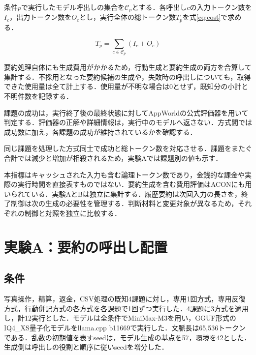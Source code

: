 \documentclass[letter]{ieicej}
\begin{document}
\par\noindent\begin{minipage}{\columnwidth}
\setlength{\abovedisplayskip}{4pt}\setlength{\belowdisplayskip}{4pt}
条件$p$で実行したモデル呼出しの集合を$\mathcal C_p$とする．各呼出し$c$の入力トークン数を$I_c$，出力トークン数を$O_c$とし，実行全体の総トークン数$T_p$を\mbox{式\eqref{eq:cost}で求める．}

\begin{equation}
 T_p=\sum_{c\in\mathcal C_p}(I_c+O_c)
 \label{eq:cost}
\end{equation}

要約処理自体にも生成費用がかかるため，行動生成と要約生成の両方を合算して集計する．不採用となった要約候補の生成や，失敗時の呼出しについても，取得できた使用量は全て計上する．使用量が不明な場合は0とせず，既知分の小計と不明件数を記録する．

\end{minipage}\par{}

課題の成功は，実行終了後の最終状態に対してAppWorld\cite{trivedi2024appworld}の公式評価器を用いて判定する．評価器の正解や詳細情報は，実行中のモデルへ返さない．方式間では成功数に加え，各課題の成功が維持されているかを確認する．

同じ課題を処理した方式同士で成功と総トークン数を対応させる．課題をまたぐ合計では減少と増加が相殺されるため，実験Aでは課題別の値も示す．

本指標はキャッシュされた入力も含む論理トークン数であり，金銭的な課金や実際の実行時間を直接表すものではない\cite{xu2026tokenpilot}．要約生成を含む費用評価はACON\cite{kang2026acon}にも用いられている．実験AとBは独立に集計する．履歴要約は次回入力の長さを，終了制御は次の生成の必要性を管理する．判断材料と変更対象が異なるため，それぞれの制御と対照を独立に比較する．

\section{実験A：要約の呼出し配置}

\subsection{条件}

写真操作，精算，返金，CSV処理の既知4課題に対し，専用1回方式，専用反復方式，行動併記方式の各方式を各課題で1回ずつ実行した．4課題に3方式を適用し，計12実行とした．モデルは全条件でMiniMax-M3を用い，GGUF形式のIQ4\_XS量子化モデルをllama.cpp b11669で実行した．文脈長は65,536トークンである．乱数の初期値を表すseedは，モデル生成の基点を57，環境を42とした．生成側は呼出しの役割と順序に従いseedを増分した．
\end{document}
